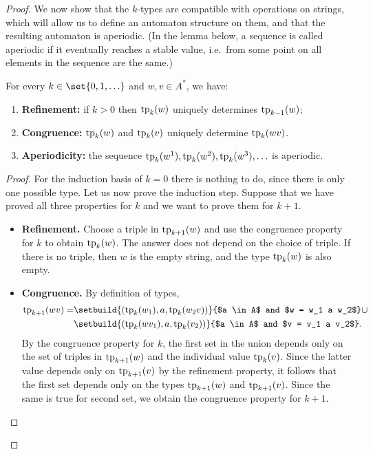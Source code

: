 \begin{proof}
We now show that the $k$-types are compatible with operations on strings, which will allow us to define an automaton structure on them, and that the resulting automaton is aperiodic. (In the lemma below, a sequence is called aperiodic if it eventually reaches a stable value, i.e.~from some point on all elements in the sequence are the same.)

    \begin{lemma}\label{lem:k-types-properties}
        For every $k \in \set{0,1,\ldots}$ and $w, v \in A^*$, we have:
            \begin{enumerate}
        \item \label{item:fo-types-more-information} \textbf{Refinement:} if $k > 0$ then $\text{tp}_k(w)$ uniquely determines  $\text{tp}_{k-1}(w)$;
        \item  \textbf{Congruence:} \label{item:fo-types-congruence} $\text{tp}_k(w)$ and $\text{tp}_k(v)$ uniquely determine  $\text{tp}_k(w v)$.
        \item \textbf{Aperiodicity:} \label{item:fo-types-aperiodic} the sequence $\text{tp}_k(w^1), \text{tp}_k(w^2), \text{tp}_k(w^3), \ldots$ is aperiodic.
    \end{enumerate}
    \end{lemma}
    \begin{proof}
        For the induction basis of $k=0$ there is nothing to do, since there is only one possible type. Let us now prove the induction step. 
        Suppose that we have proved all three properties for $k$ and we want to prove them for $k+1$.
        \begin{itemize}
            \item \textbf{Refinement.} Choose a  triple  in $ \text{tp}_{k+1}(w)$ and use the congruence property for $k$ to obtain  $\text{tp}_{k}(w)$.  The answer does not depend on the choice of triple. If there is no triple, then $w$ is the empty string, and the type $\text{tp}_{k}(w)$ is also empty.
            \item \textbf{Congruence.} By definition of types, 
        \begin{align*}
\fotype_{k+1}(wv) = &      \setbuild{ (\fotype_{k}(w_1), a, \fotype_{k}(w_2v))}{$a \in A$ and $w = w_1 a w_2$}   \cup \\ 
     &    \setbuild{ (\fotype_{k}(wv_1), a, \fotype_{k}(v_2))}{$a \in A$ and $v = v_1 a v_2$}.
        \end{align*}
    By the congruence property for $k$, the first set in the union depends only on the set of triples in $\text{tp}_{k+1}(w)$ and the individual value $\text{tp}_{k}(v)$. Since the latter value depends only on $\text{tp}_{k+1}(v)$ by the refinement property, it follows that the first set depends only on the types $\text{tp}_{k+1}(w)$ and $\text{tp}_{k+1}(v)$. Since the same is true for  second set, we obtain the congruence property for $k+1$.

\end{itemize}
\end{proof}
\end{proof}
